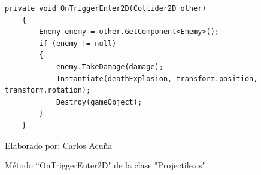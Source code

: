 \documentclass[a4paper, openright, 12pt]{report}
\begin{document}
\begin{itemize}
\begin{figure}[h]
\captionsetup{justification=centering,margin=2cm}
\centering
\lstset{language=C, breaklines=true, basicstyle=\footnotesize}
\lstset{numbers=left, numberstyle=\tiny, stepnumber=1, numbersep=-2pt}
\captionsetup{justification=centering,margin=2cm}
\begin{lstlisting}[frame=single]
    private void OnTriggerEnter2D(Collider2D other)
    {
        Enemy enemy = other.GetComponent<Enemy>();
        if (enemy != null)
        {
            enemy.TakeDamage(damage);
            Instantiate(deathExplosion, transform.position, transform.rotation);
            Destroy(gameObject);
        }
    }
\end{lstlisting}
\caption{Método ``OnTriggerEnter2D" de la clase "Projectile.cs"}
Elaborado por: Carlos Acuña
\end{figure}

\end{itemize}
\end{document}
